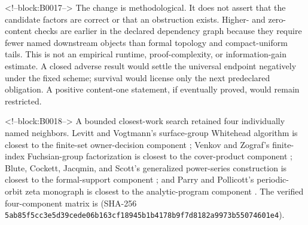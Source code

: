 \documentclass[11pt]{article}
\begin{document}
<!--block:B0017-->
The change is methodological. It does not assert that the candidate factors
are correct or that an obstruction exists. Higher- and zero-content checks are
earlier in the declared dependency graph because they require fewer named
downstream objects than formal topology and compact-uniform tails. This is not
an empirical runtime, proof-complexity, or information-gain estimate. A closed
adverse result would settle the universal endpoint negatively under the fixed
scheme; survival would license only the next predeclared obligation. A positive
content-one statement, if eventually proved, would remain restricted.

<!--block:B0018-->
A bounded closest-work search retained four individually named neighbors.
Levitt and Vogtmann's surface-group Whitehead algorithm is closest to the
finite-set owner-decision component \citep{P32-CW01}; Venkov and Zograf's
finite-index Fuchsian-group factorization is closest to the cover-product
component \citep{P32-CW02}; Blute, Cockett, Jacqmin, and Scott's generalized
power-series construction is closest to the formal-support component
\citep{P32-CW03}; and Parry and Pollicott's periodic-orbit zeta monograph is
closest to the analytic-program component \citep{P32-CW04}.  The verified
four-component matrix is
(SHA-256 \texttt{5ab85f5c\allowbreak{}c3e5d39c\allowbreak{}ede06b16\allowbreak{}3cf18945\allowbreak{}b1b4178b\allowbreak{}9f7d8182\allowbreak{}a9973b55\allowbreak{}074601e4}).
\end{document}
